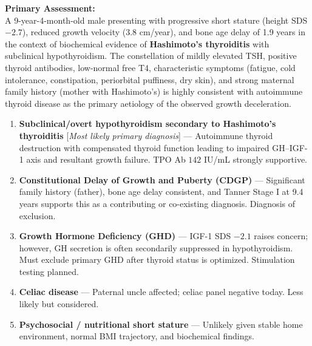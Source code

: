\documentclass[11pt,a4paper]{article}
\newcommand{\highlight}[1]{{\color{PedBlue}\textbf{#1}}}
\begin{document}
\begin{tcolorbox}[pedgold, title={\faClipboardCheck\enspace Assessment \& Differential Diagnosis}]

\textbf{\color{PedGold}Primary Assessment:}\\[4pt]
A 9-year-4-month-old male presenting with progressive short stature (height SDS $-2.7$),
reduced growth velocity (3.8 cm/year), and bone age delay of 1.9 years in the
context of biochemical evidence of \highlight{Hashimoto's thyroiditis} with subclinical
hypothyroidism. The constellation of mildly elevated TSH, positive thyroid antibodies,
low-normal free T4, characteristic symptoms (fatigue, cold intolerance, constipation,
periorbital puffiness, dry skin), and strong maternal family history (mother with
Hashimoto's) is highly consistent with autoimmune thyroid disease as the primary
aetiology of the observed growth deceleration.

\medskip
\begin{enumerate}[leftmargin=1.6em, itemsep=4pt, topsep=2pt,
  label={\color{PedGold}\textbf{\arabic*.}}]
  \item \textbf{Subclinical/overt hypothyroidism secondary to Hashimoto's thyroiditis}
        [\textit{Most likely primary diagnosis}] --- Autoimmune thyroid destruction
        with compensated thyroid function leading to impaired GH--IGF-1 axis and
        resultant growth failure. TPO Ab $142$ IU/mL strongly supportive.
  \item \textbf{Constitutional Delay of Growth and Puberty (CDGP)} --- Significant
        family history (father), bone age delay consistent, and Tanner Stage I at
        9.4 years supports this as a contributing or co-existing diagnosis.
        Diagnosis of exclusion.
  \item \textbf{Growth Hormone Deficiency (GHD)} --- IGF-1 SDS $-2.1$ raises
        concern; however, GH secretion is often secondarily suppressed in
        hypothyroidism. Must exclude primary GHD after thyroid status is optimized.
        Stimulation testing planned.
  \item \textbf{Celiac disease} --- Paternal uncle affected; celiac panel negative
        today. Less likely but considered.
  \item \textbf{Psychosocial / nutritional short stature} --- Unlikely given stable
        home environment, normal BMI trajectory, and biochemical findings.
\end{enumerate}

\end{tcolorbox}
\end{document}
